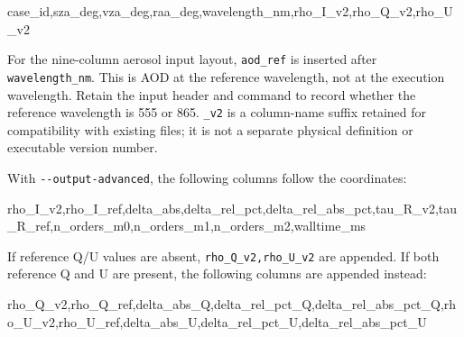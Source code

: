 \begin{ManualCode}
case_id,sza_deg,vza_deg,raa_deg,wavelength_nm,rho_I_v2,rho_Q_v2,rho_U_v2
\end{ManualCode}

For the nine-column aerosol input layout, \texttt{aod\_\allowbreak{}ref} is inserted after \texttt{wavelength\_\allowbreak{}nm}. This is AOD at the reference wavelength, not at the execution wavelength. Retain the input header and command to record whether the reference wavelength is 555 or 865. \texttt{\_\allowbreak{}v2} is a column-name suffix retained for compatibility with existing files; it is not a separate physical definition or executable version number.

With \texttt{-\allowbreak{}-\allowbreak{}output-\allowbreak{}advanced}, the following columns follow the coordinates:


\begin{ManualCode}
rho_I_v2,rho_I_ref,delta_abs,delta_rel_pct,delta_rel_abs_pct,tau_R_v2,tau_R_ref,n_orders_m0,n_orders_m1,n_orders_m2,walltime_ms
\end{ManualCode}

If reference Q/U values are absent, \texttt{rho\_\allowbreak{}Q\_\allowbreak{}v2,\allowbreak{}rho\_\allowbreak{}U\_\allowbreak{}v2} are appended. If both reference Q and U are present, the following columns are appended instead:


\begin{ManualCode}
rho_Q_v2,rho_Q_ref,delta_abs_Q,delta_rel_pct_Q,delta_rel_abs_pct_Q,rho_U_v2,rho_U_ref,delta_abs_U,delta_rel_pct_U,delta_rel_abs_pct_U
\end{ManualCode}


